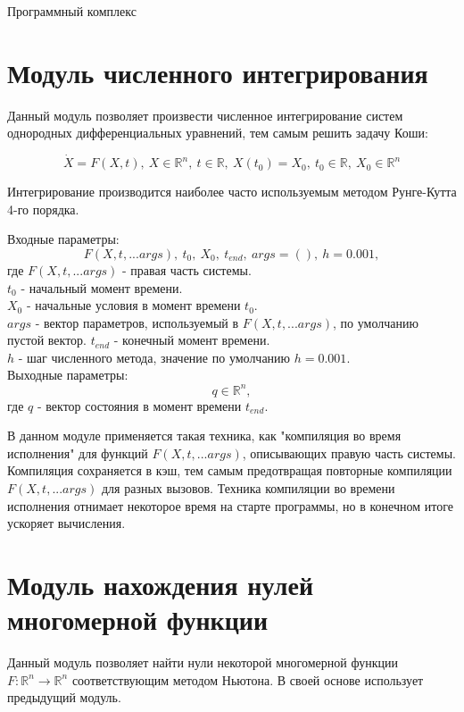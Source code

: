 \begin{chapter}{Программный комплекс}
\section{Модуль численного интегрирования}
Данный модуль позволяет произвести численное интегрирование систем однородных
дифференциальных уравнений, тем самым решить задачу Коши:

$$
\dot{X} = F(X, t), \ X \in \mathbb{R}^n, \ t \in \mathbb{R}, \ X(t_0) = X_0, \ t_0 \in \mathbb{R}, \ X_0 \in \mathbb{R}^n
$$

Интегрирование производится наиболее часто используемым методом Рунге-Кутта 4-го порядка.

Входные параметры: $$F(X, t, ...args), \ t_0, \ X_0,  \ t_{end}, \ args = (), \ h=0.001,$$
где $F(X, t, ...args)$ - правая часть системы. \\
$t_0$ - начальный момент времени. \\
$X_0$ - начальные условия в момент времени $t_0$. \\
$args$ - вектор параметров, используемый в $F(X, t, ...args)$, по умолчанию пустой вектор.
$t_{end}$ - конечный момент времени. \\
$h$ - шаг численного метода, значение по умолчанию $h = 0.001$. \\
Выходные параметры: $$ q \in \mathbb{R}^n,$$
где $q$ - вектор состояния в момент времени $t_{end}$.

В данном модуле применяется такая техника, как "компиляция во время исполнения"
для функций $F(X, t, ...args)$, описывающих правую часть системы. Компиляция сохраняется в кэш, тем
самым предотвращая повторные компиляции $F(X, t, ...args)$ для разных вызовов.
Техника компиляции во времени исполнения отнимает некоторое время на старте программы, но в конечном итоге ускоряет вычисления.

\section{Модуль нахождения нулей многомерной функции}
Данный модуль позволяет найти нули некоторой многомерной функции $F: \mathbb{R}^n \rightarrow \mathbb{R}^n$ соответствующим методом Ньютона.
В своей основе использует предыдущий модуль.


\end{chapter}
